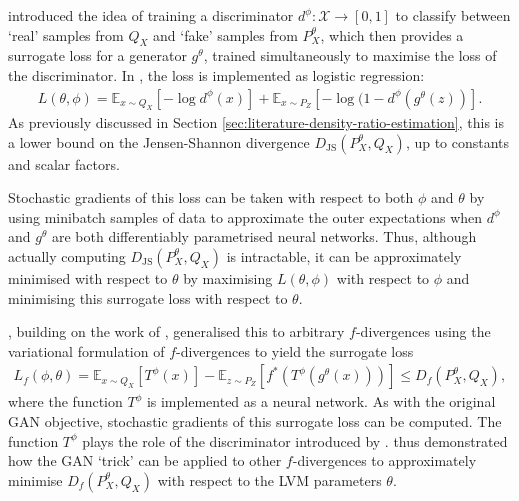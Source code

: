 \cite{goodfellow2014generative} introduced the idea of training a discriminator $d^\phi: \mathcal{X} \to [0,1]$ to classify between `real' samples from $Q_X$ and `fake' samples from $P^\theta_X$, which then provides a surrogate loss for a generator $g^\theta$, trained simultaneously to maximise the loss of the discriminator. 
In \cite{goodfellow2014generative}, the loss is implemented as logistic regression:
%
\begin{align*}
L(\theta, \phi) = \mathbb{E}_{x\sim Q_X}\left[ -\log d^\phi(x) \right] + \mathbb{E}_{x \sim P_Z} \left[- \log(1 - d^\phi(g^\theta(z)) \right].
\end{align*}
%
As previously discussed in Section \ref{sec:literature-density-ratio-estimation}, this is a lower bound on the Jensen-Shannon divergence $D_{\text{JS}}(P^\theta_X, Q_X)$, up to constants and scalar factors.

Stochastic gradients of this loss can be taken with respect to both $\phi$ and $\theta$ by using minibatch samples of data to approximate the outer expectations when $d^\phi$ and $g^\theta$ are both differentiably parametrised neural networks.
Thus, although actually computing $D_{\text{JS}}(P^\theta_X, Q_X)$ is intractable, it can be approximately minimised with respect to $\theta$ by maximising $L(\theta, \phi)$ with respect to $\phi$ and minimising this surrogate loss with respect to $\theta$.


\cite{nowozin2016f}, building on the work of \cite{nguyen10ratio}, generalised this to arbitrary $f$-divergences using the variational formulation of $f$-divergences to yield the surrogate loss
%
%
\begin{align*}
L_f(\phi, \theta) = \mathbb{E}_{x \sim Q_X} \left[ T^\phi(x) \right] - \mathbb{E}_{z \sim P_Z} \left[ f^*(T^\phi(g^\theta(x))) \right] \leq D_f(P^\theta_X, Q_X),
\end{align*}
%
where the function $T^\phi$ is implemented as a neural network.
As with the original GAN objective, stochastic gradients of this surrogate loss can be computed. 
The function $T^\phi$ plays the role of the discriminator introduced by \cite{goodfellow2014generative}. %
\cite{nowozin2016f} thus demonstrated how the GAN `trick' can be applied to other $f$-divergences to approximately minimise $D_f(P^\theta_X, Q_X)$ with respect to the LVM parameters $\theta$.

